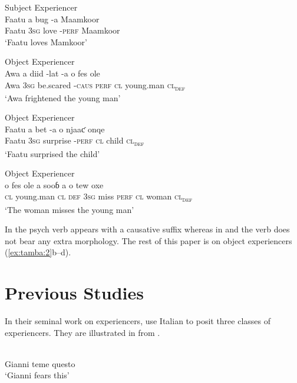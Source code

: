 \documentclass[output=paper]{langscibook}
\begin{document}
\ea \label{ex:tamba:2}
\ea Subject Experiencer \label{ex:tamba:2a}\\
\gll    Faatu    a              bug  {}-a              Maamkoor\\
        Faatu   \textsc{3sg}  love  {}-\textsc{perf}    Maamkoor\\
\glt    `Faatu loves Mamkoor'

\ex Object Experiencer \label{ex:tamba:2b}\\
\gll Awa a diid -lat -a o fes ole\\
    Awa \textsc{3sg} be.scared -\textsc{caus} \textsc{perf} \textsc{cl} young.man \textsc{cl\textsubscript{def}}\\
\glt `Awa frightened the young man'

\ex Object Experiencer \label{ex:tamba:2c}\\
\gll Faatu  a               bet         -a       o               njaaƈ       onqe\\
    Faatu   \textsc{3sg}    surprise    -\textsc{perf}  \textsc{cl}    child   \textsc{cl\textsubscript{def}} \\
\glt `Faatu surprised the child'


\ex Object Experiencer \label{ex:tamba:2d}\\
\gll o     fes             ole        a       sooɓ  a        o  tew   oxe\\
 \textsc{cl} young.man  \textsc{cl\textsubscript{} \textsc{def}}     \textsc{3sg}       miss  \textsc{perf}   \textsc{cl}  woman \textsc{cl\textsubscript{def}}\\
\glt   `The woman  misses the young man'
\z
\z 

In  the psych verb appears with a causative suffix whereas in   and  the verb does not bear any extra morphology. The rest of this paper is on object experiencers (\ref{ex:tamba:2}b--d).

\section{Previous Studies}

In their seminal work on experiencers, \citet{Belletti1988} use Italian to posit three classes of experiencers. They are illustrated in  from \citet[291--292]{Belletti1988}.

\ea \label{ex:tamba:3}
\\
\ea \label{ex:tamba:3a}
 Gianni teme questo\\
\glt `Gianni fears this'
\end{document}
